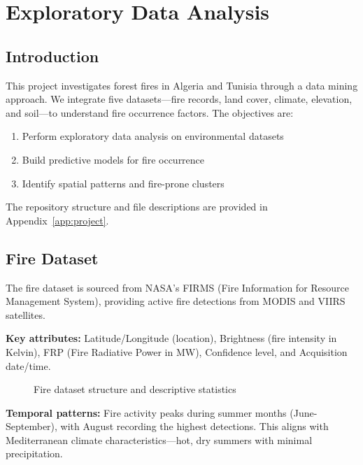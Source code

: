 \chapter{Exploratory Data Analysis}

\section{Introduction}
This project investigates forest fires in Algeria and Tunisia through a data mining approach. We integrate five datasets---fire records, land cover, climate, elevation, and soil---to understand fire occurrence factors. The objectives are:
\begin{enumerate}
    \item Perform exploratory data analysis on environmental datasets
    \item Build predictive models for fire occurrence
    \item Identify spatial patterns and fire-prone clusters
\end{enumerate}

The repository structure and file descriptions are provided in Appendix~\ref{app:project}.

\section{Fire Dataset}
The fire dataset is sourced from NASA's FIRMS (Fire Information for Resource Management System), providing active fire detections from MODIS and VIIRS satellites.

\textbf{Key attributes:} Latitude/Longitude (location), Brightness (fire intensity in Kelvin), FRP (Fire Radiative Power in MW), Confidence level, and Acquisition date/time.

\begin{figure}[H]
    \centering
    \caption{Fire dataset structure and descriptive statistics}
    \label{fig:fire_structure}
\end{figure}

\textbf{Temporal patterns:} Fire activity peaks during summer months (June-September), with August recording the highest detections. This aligns with Mediterranean climate characteristics---hot, dry summers with minimal precipitation.

